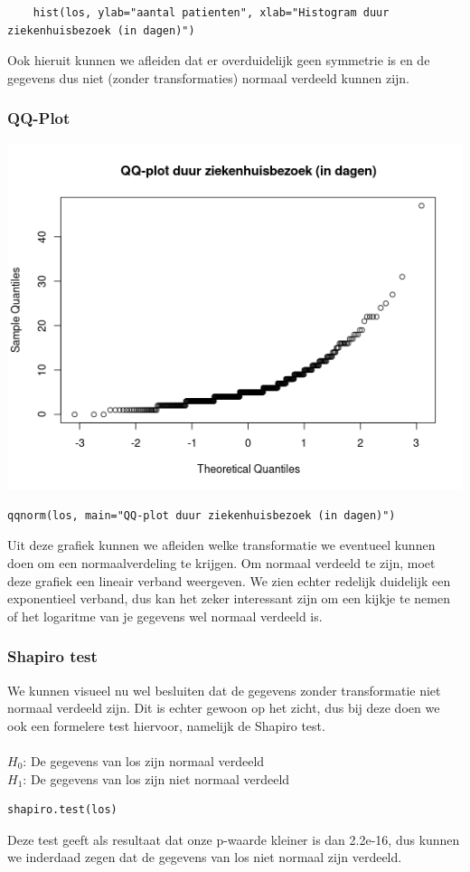\documentclass{article}
\begin{document}
\begin{verbatim}
    hist(los, ylab="aantal patienten", xlab="Histogram duur ziekenhuisbezoek (in dagen)") 
\end{verbatim}
    
Ook hieruit kunnen we afleiden dat er overduidelijk geen symmetrie is en de gegevens dus niet (zonder transformaties) normaal verdeeld kunnen zijn.
\subsubsection{QQ-Plot}
\begin{center}
    \includegraphics[scale=0.5]{output/qqplot-los.png}
\end{center}
\begin{verbatim}
qqnorm(los, main="QQ-plot duur ziekenhuisbezoek (in dagen)")
\end{verbatim}
Uit deze grafiek kunnen we afleiden welke transformatie we eventueel kunnen doen om een normaalverdeling te krijgen. Om normaal verdeeld te zijn, moet deze grafiek een lineair verband weergeven. We zien echter redelijk duidelijk een exponentieel verband, dus kan het zeker interessant zijn om een kijkje te nemen of het logaritme van je gegevens wel normaal verdeeld is.
\subsubsection{Shapiro test}
We kunnen visueel nu wel besluiten dat de gegevens zonder transformatie niet normaal verdeeld zijn. Dit is echter gewoon op het zicht, dus bij deze doen we ook een formelere test hiervoor, namelijk de Shapiro test. \\ \\
$H_0$: De gegevens van los zijn normaal verdeeld \\
$H_1$: De gegevens van los zijn niet normaal verdeeld 
\begin{verbatim}
shapiro.test(los)
\end{verbatim} 
Deze test geeft als resultaat dat onze p-waarde kleiner is dan 2.2e-16, dus kunnen we inderdaad zegen dat de gegevens van los niet normaal zijn verdeeld.
\end{document}
